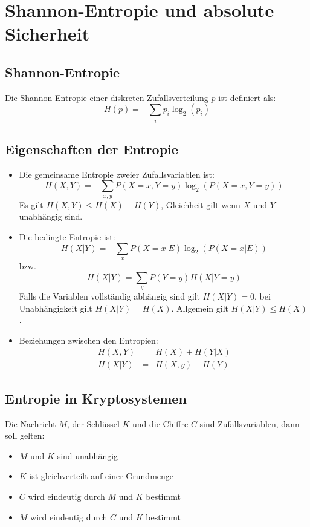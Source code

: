 \chapter{Shannon-Entropie und absolute Sicherheit}
\section{Shannon-Entropie}
Die Shannon Entropie einer diskreten Zufallsverteilung $p$ ist definiert als:
\begin{equation}
    H(p) = -\sum_i p_i \log_2 (p_i)
\end{equation}

\section{Eigenschaften der Entropie}
\begin{itemize}
    \item 
        Die gemeinsame Entropie zweier Zufallsvariablen ist:
        \begin{equation}
            H(X, Y) = - \sum_{x, y} P(X=x, Y=y) \log_2 \left( P(X=x, Y=y)\right)
        \end{equation}
        Es gilt $H(X, Y) \leq H(X) + H(Y)$, Gleichheit gilt wenn $X$ und $Y$ unabhängig sind.
    \item
        Die bedingte Entropie ist:
        \begin{equation}
            H(X|Y) = - \sum_x P(X=x|E) \log_2\left(P(X=x | E)\right)
        \end{equation}
        bzw.
        \begin{equation}
            H(X|Y) = \sum_y P(Y=y) H(X|Y=y)
        \end{equation}
        Falls die Variablen vollständig abhängig sind gilt $H(X|Y)=0$, bei Unabhängigkeit gilt $H(X|Y) = H(X)$. Allgemein gilt $H(X|Y) \leq H(X)$.

    \item Beziehungen zwischen den Entropien:
        \begin{eqnarray}
            H(X, Y) &=& H(X) + H(Y|X) \\
            H(X|Y) &=& H(X, y) - H(Y)
        \end{eqnarray}
\end{itemize}

\section{Entropie in Kryptosystemen}
Die Nachricht $M$, der Schlüssel $K$ und die Chiffre $C$ sind Zufallsvariablen, 
dann soll gelten:
\begin{itemize}
    \item $M$ und $K$ sind unabhängig
    \item $K$ ist gleichverteilt auf einer Grundmenge
    \item $C$ wird eindeutig durch $M$ und $K$ bestimmt
    \item $M$ wird eindeutig durch $C$ und $K$ bestimmt
\end{itemize}

